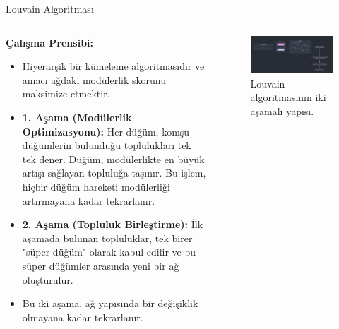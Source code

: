 \documentclass{beamer}
\begin{document}
\begin{frame}{Louvain Algoritması}
    \begin{columns}[T]
        \begin{column}{.5\textwidth}
            \textbf{Çalışma Prensibi:}
            \begin{itemize}
                \item Hiyerarşik bir kümeleme algoritmasıdır ve amacı ağdaki modülerlik skorunu maksimize etmektir.
                \item \textbf{1. Aşama (Modülerlik Optimizasyonu):} Her düğüm, komşu düğümlerin bulunduğu toplulukları tek tek dener. Düğüm, modülerlikte en büyük artışı sağlayan topluluğa taşınır. Bu işlem, hiçbir düğüm hareketi modülerliği artırmayana kadar tekrarlanır.
                \item \textbf{2. Aşama (Topluluk Birleştirme):} İlk aşamada bulunan topluluklar, tek birer "süper düğüm" olarak kabul edilir ve bu süper düğümler arasında yeni bir ağ oluşturulur.
                \item Bu iki aşama, ağ yapısında bir değişiklik olmayana kadar tekrarlanır.
            \end{itemize}
        \end{column}
        \begin{column}{.5\textwidth}
            \begin{figure}
                \includegraphics[width=\textwidth]{images/louvain.jpg}
                \caption{Louvain algoritmasının iki aşamalı yapısı.}
            \end{figure}
        \end{column}
    \end{columns}
\end{frame}
\end{document}
